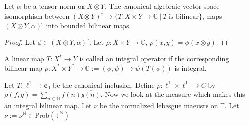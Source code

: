 

\begin{lemma}
  Let $\alpha$ be a tensor norm on $X \otimes Y$. The canonical
  algebraic vector space isomorphism between $(X \otimes Y)^{\circ} \to
  \{  T: X \times Y \to \mathbb{C} \ | \ T \textrm{ is bilinear} \}$,
  maps $(X \otimes Y, \alpha)^\circ$ into bounded bilinear maps.
\end{lemma}
\begin{proof}
  Let $\phi \in (X \otimes Y, \alpha)^\circ$. Let $\rho: X \times Y
  \to \mathbb{C}$, $\rho(x, y) = \phi(x \otimes y)$.
\end{proof}

\begin{definition}
  A linear map $T: X^* \to Y$ is called an integral operator if the
  corresponding bilinear map $\rho :   X^* \times Y^* \to \mathbb{C}
  := (\phi, \psi) \mapsto  \psi(T(\phi))$ is integral.
\end{definition}

\begin{example}
  Let $T: \ell^{1} \to \textbf{c}_0$ be the canonical inclusion.
  Define $\rho: \ell^{1} \times \ell^{1} \to C $ by $\rho(f, g) =
  \sum_{n \in \mathbb{N}} f(n)\overline{g(n)}$. Now we look at the
  measure which makes this an integral bilinear map. Let $\nu$ be the
  normalized lebesgue maeusre on $\mathbb{T}$. Let $\tilde{\nu} :=
  \nu^{\mathbb{N}} \in \textrm{Prob}(\mathbb{T}^{\mathbb{N}})$
\end{example}
